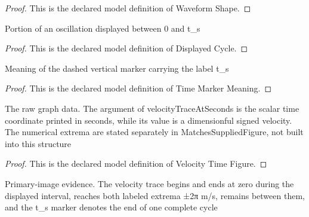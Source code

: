 \begin{proof}
  This is the declared model definition of Waveform Shape.
\end{proof}
\begin{definition}
  \label{def:physics:phyx-mini-0280:phyxminiproblems-problemphyxmini0280-displayedcycle}
  Portion of an oscillation displayed between 0 and t\_s
\end{definition}
\begin{proof}
  This is the declared model definition of Displayed Cycle.
\end{proof}
\begin{definition}
  \label{def:physics:phyx-mini-0280:phyxminiproblems-problemphyxmini0280-timemarkermeaning}
  Meaning of the dashed vertical marker carrying the label t\_s
\end{definition}
\begin{proof}
  This is the declared model definition of Time Marker Meaning.
\end{proof}
\begin{definition}
  \label{def:physics:phyx-mini-0280:phyxminiproblems-problemphyxmini0280-velocitytimefigure}
  The raw graph data. The argument of velocityTraceAtSeconds is the scalar time coordinate printed in seconds, while its value is a dimensionful signed velocity. The numerical extrema are stated separately in MatchesSuppliedFigure, not built into this structure
\end{definition}
\begin{proof}
  This is the declared model definition of Velocity Time Figure.
\end{proof}
\begin{definition}
  \label{def:physics:phyx-mini-0280:phyxminiproblems-problemphyxmini0280-matchessuppliedfigure}
  Primary-image evidence. The velocity trace begins and ends at zero during the displayed interval, reaches both labeled extrema ±2π m/s, remains between them, and the t\_s marker denotes the end of one complete cycle
\end{definition}
